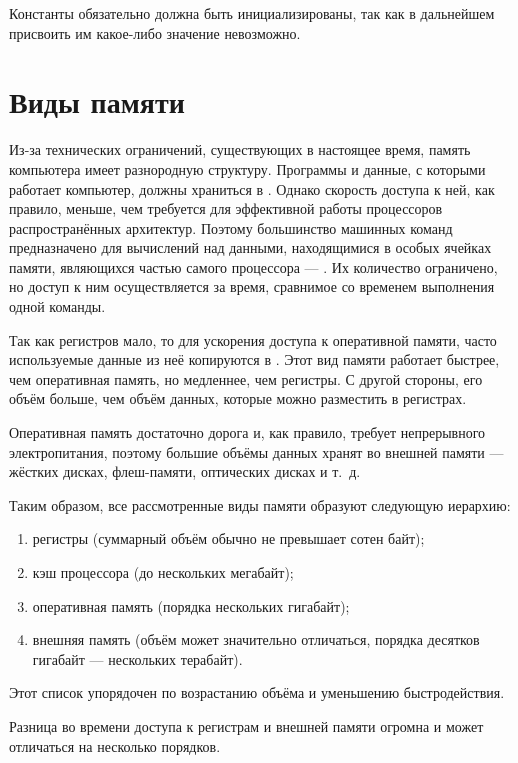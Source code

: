 Константы обязательно должна быть инициализированы, так как в
дальнейшем присвоить им какое-либо значение невозможно.

\section{Виды памяти}


Из-за технических ограничений, существующих в настоящее время, память
компьютера имеет разнородную структуру. Программы и данные, с которыми
работает компьютер, должны храниться в
. Однако скорость доступа
к ней, как правило, меньше, чем требуется для эффективной работы
процессоров распространённых архитектур. Поэтому большинство машинных
команд предназначено для вычислений над данными, находящимися в особых
ячейках памяти, являющихся частью самого процессора — . Их количество ограничено, но доступ к ним
осуществляется за время, сравнимое со временем выполнения одной
команды.

Так как регистров мало, то для ускорения доступа к оперативной памяти,
часто используемые данные из неё копируются в .  Этот вид памяти работает быстрее, чем
оперативная память, но медленнее, чем регистры. С другой стороны, его
объём больше, чем объём данных, которые можно разместить в регистрах.

Оперативная память достаточно дорога и, как правило, требует
непрерывного электропитания, поэтому большие объёмы данных хранят во
внешней памяти — жёстких дисках, флеш-памяти, оптических дисках и
т.~д.

Таким образом, все рассмотренные виды памяти образуют следующую
иерархию:
\begin{enumerate}
\item регистры (суммарный объём обычно не превышает сотен байт);
\item кэш процессора (до нескольких мегабайт);
\item оперативная память (порядка нескольких гигабайт);
\item внешняя память (объём может значительно отличаться, порядка
  десятков гигабайт — нескольких терабайт).
\end{enumerate}

Этот список упорядочен по возрастанию объёма и уменьшению
быстродействия.

Разница во времени доступа к регистрам и внешней памяти огромна и
может отличаться на несколько порядков.

